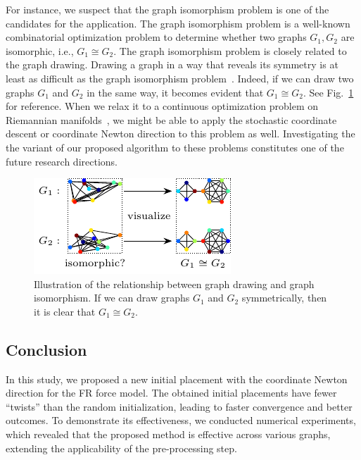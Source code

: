 \documentclass[dvipdfmx,10pt,journal,compsoc]{IEEEtran}
\begin{document}
For instance, we suspect that the graph isomorphism problem is one of the candidates for the application.
The graph isomorphism problem is a well-known combinatorial optimization problem to determine whether two graphs $G_1, G_2$ are isomorphic, i.e., $G_1 \cong G_2$.
The graph isomorphism problem is closely related to the graph drawing. Drawing a graph in a way that reveals its symmetry is at least as difficult as the graph isomorphism problem~\cite{eades1984heuristic}. Indeed, if we can draw two graphs $G_1$ and $G_2$ in the same way, it becomes evident that $G_1 \cong G_2$. See Fig.~\ref{fig:iso} for reference.
When we relax it to a continuous optimization problem on Riemannian manifolds~\cite{klusContinuousOptimizationMethods2023,klusContinuousOptimizationMethods2023}, we might be able to apply the stochastic coordinate descent or coordinate Newton direction to this problem as well.
Investigating the the variant of our proposed algorithm to these problems constitutes one of the future research directions.

\begin{figure}[t]
  \centering
  \includegraphics[width=\columnwidth]{iso/iso.pdf}
  \caption{
    Illustration of the relationship between graph drawing and graph isomorphism.
    If we can draw graphs $G_1$ and $G_2$ symmetrically, then it is clear that $G_1 \cong G_2$.
  }
  \label{fig:iso}
\end{figure}

\subsection{Conclusion} \label{sec:conclusion}

In this study, we proposed a new initial placement with the coordinate Newton direction for the FR force model.
The obtained initial placements have fewer ``twists'' than the random initialization, leading to faster convergence and better outcomes.
To demonstrate its effectiveness, we conducted numerical experiments, which revealed that the proposed method is effective across various graphs, extending the applicability of the pre-processing step.
\end{document}
